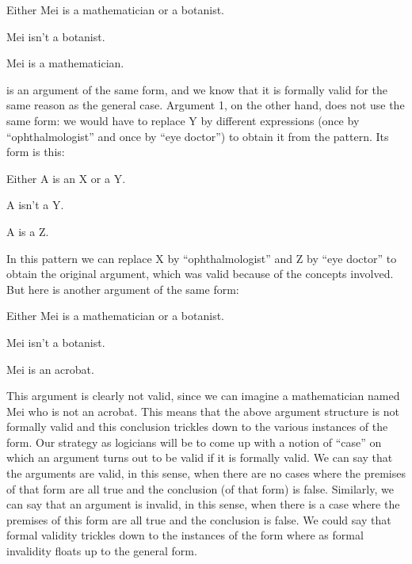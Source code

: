 \begin{earg}
\item[]Either Mei is a mathematician or a botanist.
\item[]Mei isn’t a botanist.
\item[\therefore] Mei is a mathematician.
\end{earg}
is an argument of the same form, and we know that it is formally valid for the same reason as the general case. Argument 1, on the other hand, does not use the same form: we would have to replace Y by different expressions (once by “ophthalmologist” and once by “eye doctor”) to obtain it from the pattern. Its form is this:
\begin{earg}
\item[]Either A is an X or a Y.
\item[]A isn’t a Y.
\item[\therefore] A is a Z.
\end{earg}
In this pattern we can replace X by “ophthalmologist” and Z by “eye doctor” to obtain the original argument, which was valid because of the concepts involved. But here is another argument of the same form:
\begin{earg}
\item[]Either Mei is a mathematician or a botanist.
\item[]Mei isn’t a botanist.
\item[\therefore] Mei is an acrobat.
\end{earg}
This argument is clearly not valid, since we can imagine a mathematician named Mei who is not an acrobat. This means that the above argument structure is not formally valid and this conclusion trickles down to the various instances of the form. Our strategy as logicians will be to come up with a notion of “case” on which an argument turns out to be valid if it is formally valid. We can say that the arguments are valid, in this sense, when there are no cases where the premises of that form are all true and the conclusion (of that form) is false. Similarly, we can say that an argument is invalid, in this sense, when there is a case where the premises of this form are all true and the conclusion is false. We could say that formal validity trickles down to the instances of the form where as formal invalidity floats up to the general form.

